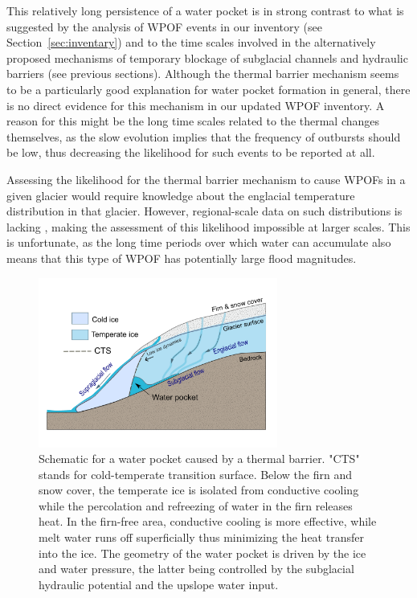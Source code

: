 This relatively long persistence of a water pocket is in strong contrast to what is suggested by the analysis of WPOF events in our inventory (see Section~\ref{sec:inventary}) and to the time scales involved in the alternatively proposed mechanisms of temporary blockage of subglacial channels and hydraulic barriers (see previous sections). Although the thermal barrier mechanism seems to be a particularly good explanation for water pocket formation in general, there is no direct evidence for this mechanism in our updated WPOF inventory. A reason for this might be the long time scales related to the thermal changes themselves, as the slow evolution implies that the frequency of outbursts should be low, thus decreasing the likelihood for such events to be reported at all. 

Assessing the likelihood for the thermal barrier mechanism to cause WPOFs in a given glacier would require knowledge about the englacial temperature distribution in that glacier. However, regional-scale data on such distributions is lacking \citep[e.g. in][]{Huss&Fischer2016}, making the assessment of this likelihood impossible at larger scales. This is unfortunate, as the long time periods over which water can accumulate also means that this type of WPOF has potentially large flood magnitudes.


\begin{figure}
    \centering
    \includegraphics[width=0.7\textwidth]{chapters/chapter_WPOFs/thermal_barrier.pdf}
    \caption{Schematic for a water pocket caused by a thermal barrier. "CTS" stands for cold-temperate transition surface. Below the firn and snow cover, the temperate ice is isolated from conductive cooling while the percolation and refreezing of water in the firn releases heat. In the firn-free area, conductive cooling is more effective, while melt water runs off superficially thus minimizing the heat transfer into the ice. The geometry of the water pocket is driven by the ice and water pressure, the latter being controlled by the subglacial hydraulic potential and the upslope water input.}
    \label{fig:WPthermo}
\end{figure}


